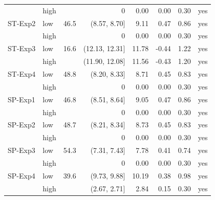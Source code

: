 {\begin{longtable}{llrrrrrl}
 & high &  & 0 & 0.00 & 0.00 & 0.30 & yes \\
ST-Exp2 & low & 46.5 & (8.57, 8.70] & 9.11 & 0.47 & 0.86 & yes \\
 & high &  & 0 & 0.00 & 0.00 & 0.30 & yes \\
ST-Exp3 & low & 16.6 & (12.13, 12.31] & 11.78 & -0.44 & 1.22 & yes \\
 & high &  & (11.90, 12.08] & 11.56 & -0.43 & 1.20 & yes \\
ST-Exp4 & low & 48.8 & (8.20, 8.33] & 8.71 & 0.45 & 0.83 & yes \\
 & high &  & 0 & 0.00 & 0.00 & 0.30 & yes \\
SP-Exp1 & low & 46.8 & (8.51, 8.64] & 9.05 & 0.47 & 0.86 & yes \\
 & high &  & 0 & 0.00 & 0.00 & 0.30 & yes \\
SP-Exp2 & low & 48.7 & (8.21, 8.34] & 8.73 & 0.45 & 0.83 & yes \\
 & high &  & 0 & 0.00 & 0.00 & 0.30 & yes \\
SP-Exp3 & low & 54.3 & (7.31, 7.43] & 7.78 & 0.41 & 0.74 & yes \\
 & high &  & 0 & 0.00 & 0.00 & 0.30 & yes \\
SP-Exp4 & low & 39.6 & (9.73, 9.88] & 10.19 & 0.38 & 0.98 & yes \\
 & high &  & (2.67, 2.71] & 2.84 & 0.15 & 0.30 & yes \\
\bottomrule
\end{longtable}
}
